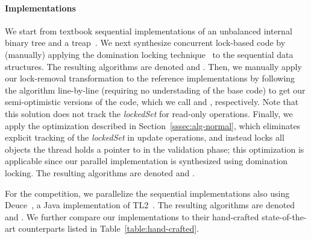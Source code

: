 
\paragraph{Implementations}
We start from textbook sequential implementations of an unbalanced internal binary
tree and a treap~\cite{AragonS1989}. We next  synthesize 
concurrent lock-based code by (manually) applying the domination locking technique~\cite{Gueta2011} to the sequential
data structures. The resulting algorithms are denoted \domTree and \domTreap.
Then, we manually apply our lock-removal transformation to the reference
implementations by following the algorithm line-by-line (requiring no understading of the base code)
to get our semi-optimistic versions of the code, which we call
\autoTree and \autoTreap, respectively. Note that this solution does not track the  \emph{lockedSet} for read-only operations.
Finally, we apply the optimization described in Section~\ref{sssec:alg-normal}, which eliminates explicit tracking of the \emph{lockedSet} in update operations,
and instead locks 
all objects the thread holds a pointer to in the validation phase; this optimization is applicable since our parallel implementation is synthesized using
domination locking. The resulting algorithms are denoted \optAutoTree and \optAutoTreap.   

For the competition, we parallelize the sequential implementations also using 
Deuce~\cite{Deuce2010}, a Java implementation of  TL2~\cite{DiceSS2006}. The resulting algorithms are denoted \stmTree and \stmTreap. We further compare our implementations to their hand-crafted state-of-the-art counterparts
listed in Table~\ref{table:hand-crafted}.


